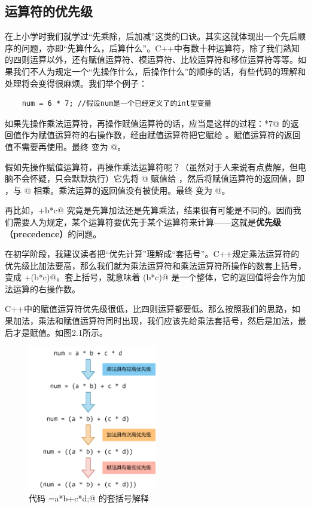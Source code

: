 \subsection*{运算符的优先级}
在上小学时我们就学过``先乘除，后加减''这类的口诀。其实这就体现出一个先后顺序的问题，亦即``先算什么，后算什么''。C++中有数十种运算符，除了我们熟知的四则运算以外，还有赋值运算符、模运算符、比较运算符和移位运算符等等。如果我们不人为规定一个``先操作什么，后操作什么''的顺序的话，有些代码的理解和处理将会变得很麻烦。我们举个例子：
\begin{lstlisting}
    num = 6 * 7; //假设num是一个已经定义了的int型变量
\end{lstlisting}\par
如果先操作乘法运算符，再操作赋值运算符的话，应当是这样的过程：*7@ 的返回值作为赋值运算符的右操作数，经由赋值运算符把它赋给 \lstinline@num@。赋值运算符的返回值不需要再使用。最终 \lstinline@num@ 变为 @。\par
假如先操作赋值运算符，再操作乘法运算符呢？（虽然对于人来说有点费解，但电脑不会怀疑，只会默默执行）它先将 @ 赋值给 \lstinline@num@，然后将赋值运算符的返回值，即 \lstinline@num@，与 @ 相乘。乘法运算的返回值没有被使用。最终 \lstinline@num@ 变为 @。\par
再比如，\lstinline@a+b*c@ 究竟是先算加法还是先算乘法，结果很有可能是不同的。因而我们需要人为规定，某个运算符要优先于某个运算符来计算——这就是\textbf{优先级（precedence）}的问题。\par
在初学阶段，我建议读者把``优先计算''理解成``套括号''。C++规定乘法运算符的优先级比加法要高，那么我们就为乘法运算符和乘法运算符所操作的数套上括号，变成 \lstinline@a+(b*c)@。套上括号，就意味着 \lstinline@(b*c)@ 是一个整体，它的返回值将会作为加法运算的右操作数。\par
C++中的赋值运算符优先级很低，比四则运算都要低。那么按照我们的思路，如果加法，乘法和赋值运算符同时出现，我们应该先给乘法套括号，然后是加法，最后才是赋值。如图2.1所示。\par
\begin{figure}[htbp]
    \centering
    \includegraphics[width=0.5\textwidth]{../images/generalized_parts/02_Precedence_of_multiply_addition_and_assignment.drawio.png}
    \caption{代码 \lstinline@num=a*b+c*d;@ 的套括号解释}
\end{figure}
